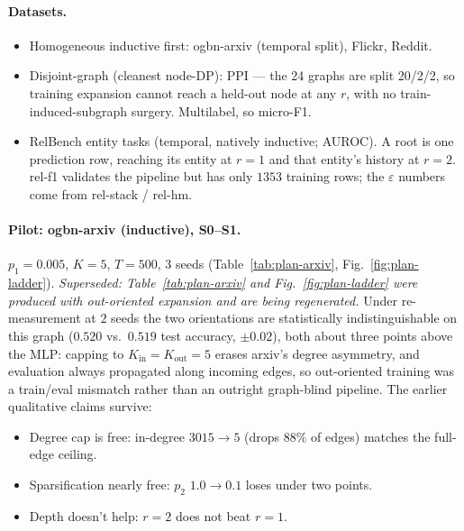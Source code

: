 \paragraph{Datasets.}
\begin{itemize}
  \item Homogeneous inductive first: ogbn-arxiv (temporal split), Flickr, Reddit.
  \item Disjoint-graph (cleanest node-DP): PPI --- the 24 graphs are split 20/2/2,
        so training expansion cannot reach a held-out node at any $r$, with no
        train-induced-subgraph surgery. Multilabel, so micro-F1.
  \item RelBench entity tasks (temporal, natively inductive; AUROC). A root is one
        prediction row, reaching its entity at $r{=}1$ and that entity's history at
        $r{=}2$. rel-f1 validates the pipeline but has only $1353$ training rows;
        the $\varepsilon$ numbers come from rel-stack / rel-hm.
\end{itemize}

\paragraph{Pilot: ogbn-arxiv (inductive), S0--S1.} $p_1{=}0.005$, $K{=}5$, $T{=}500$, 3 seeds (Table~\ref{tab:plan-arxiv}, Fig.~\ref{fig:plan-ladder}).
\emph{Superseded: Table~\ref{tab:plan-arxiv} and Fig.~\ref{fig:plan-ladder} were
produced with out-oriented expansion and are being regenerated.} Under
re-measurement at $2$ seeds the two orientations are statistically
indistinguishable on this graph ($0.520$ vs.\ $0.519$ test accuracy, $\pm 0.02$),
both about three points above the MLP: capping to $K_{\mathrm{in}}{=}K_{\mathrm{out}}{=}5$
erases arxiv's degree asymmetry, and evaluation always propagated along incoming
edges, so out-oriented training was a train/eval mismatch rather than an outright
graph-blind pipeline. The earlier qualitative claims survive:
\begin{itemize}
  \item Degree cap is free: in-degree $3015\!\to\!5$ (drops $88\%$ of edges) matches the full-edge ceiling.
  \item Sparsification nearly free: $p_2$ $1.0\!\to\!0.1$ loses under two points.
  \item Depth doesn't help: $r{=}2$ does not beat $r{=}1$.
\end{itemize}

